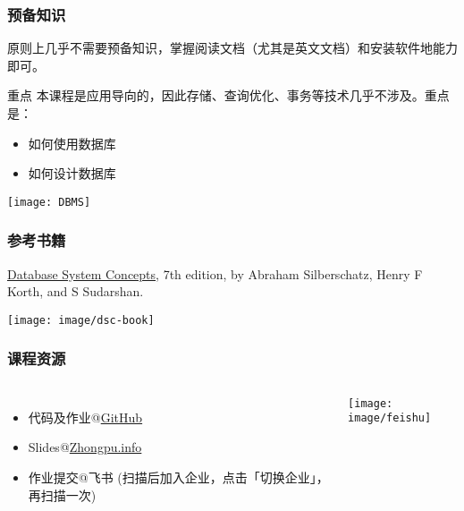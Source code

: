 \documentclass[aspectratio=169, 14pt]{beamer}
\begin{document}
\begin{frame}
    \frametitle{预备知识}    
原则上几乎不需要预备知识，掌握\alert{阅读文档}（尤其是英文文档）和\alert{安装软件}地能力即可。
\pause
\begin{block}{重点}
本课程是应用导向的，因此存储、查询优化、事务等技术几乎不涉及。重点是：
\begin{itemize}
    \item  如何使用数据库
    \item  如何设计数据库
\end{itemize}
    
\end{block}
\end{frame}

\begin{frame}[fragile]
\begin{center}
    \texttt{[image: DBMS]}
\end{center}
\end{frame}

\begin{frame}
    \frametitle{参考书籍}
    \href{https://book.douban.com/subject/30345517/}{Database System Concepts}, 7th edition, by Abraham Silberschatz, Henry F Korth, and S Sudarshan.
    \begin{center}
        \texttt{[image: image/dsc-book]}
    \end{center}
\end{frame}

\begin{frame}
    \frametitle{课程资源}
    \begin{columns}
        \begin{itemize}
            \item 代码及作业@\href{https://github.com/ChenZhongPu/db-swufe}{GitHub}
            \item Slides@\href{https://zhongpu.info/teaching/cs205-2022-fall/}{Zhongpu.info}
            \item 作业提交@飞书 (\small 扫描后加入企业，点击\alert{「切换企业」}，再扫描一次)
        \end{itemize}
        \texttt{[image: image/feishu]}
    \end{columns}
\end{frame}
\end{document}
